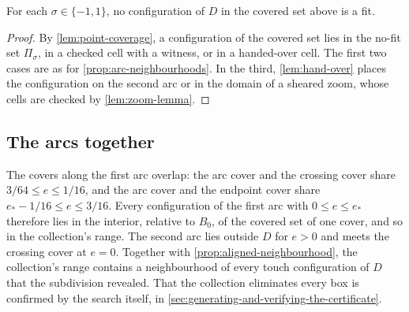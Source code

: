 \begin{proposition}\label{prop:crossing-neighbourhoods}
  For each $\sigma\in\{-1,1\}$, no configuration of $D$ in the covered set
  above is a fit.
\end{proposition}
\begin{proof}
  By \cref{lem:point-coverage}, a configuration of the covered set lies in
  the no-fit set $\Pi_\sigma$, in a checked cell with a witness, or in a
  handed-over cell.
  The first two cases are as for \cref{prop:arc-neighbourhoods}. In the
  third, \cref{lem:hand-over} places the configuration on the second arc
  or in the domain of a sheared zoom, whose cells are checked by
  \cref{lem:zoom-lemma}.
\end{proof}

\subsection{The arcs together}\label{subsec:the-arcs-together}

The covers along the first arc overlap: the arc cover and the crossing
cover share $3/64\le e\le1/16$, and the arc cover and the endpoint cover
share $e_*-1/16\le e\le3/16$. Every configuration of the first arc with
$0\le e\le e_*$ therefore lies in the interior, relative to $B_0$, of the
covered set of one cover, and so in the collection's range. The second arc
lies outside $D$ for $e>0$ and meets the crossing cover at $e=0$. Together
with \cref{prop:aligned-neighbourhood}, the collection's range contains a
neighbourhood of every touch configuration of $D$ that the subdivision
revealed. That the collection eliminates every box is confirmed by the
search itself, in \cref{sec:generating-and-verifying-the-certificate}.

